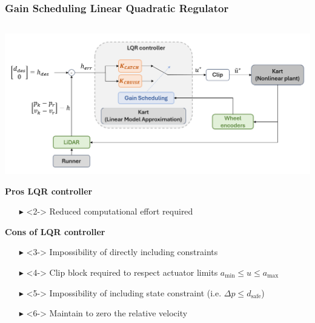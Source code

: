 \documentclass[9pt, aspectratio=169]{beamer}
\begin{document}
\begin{frame}
\frametitle{Gain Scheduling Linear Quadratic Regulator}
\begin{columns}
\begin{column}{0.40\textwidth}
	\begin{center}
  		\includegraphics[width=1.2\textwidth]{LQR_scheme} 
	\end{center}
\vspace{-0.2cm}
\begin{block}{}
\centering
\textbf{Pros LQR controller}
\begin{itemize}
\footnotesize
	\item[$\blacktriangleright$]<2-> Reduced computational effort required
\end{itemize}
\end{block}
\vspace{-0.2cm}
\begin{block}{}
\centering
\textbf{Cons of LQR controller} \\
\begin{itemize}
\footnotesize
	\item[$\blacktriangleright$]<3-> Impossibility of directly including constraints
	\item[$\blacktriangleright$]<4-> Clip block required to respect actuator limits $a_\text{min} \leq u \leq a_\text{max}$
	\item[$\blacktriangleright$]<5-> Impossibility of including state constraint (i.e. $\Delta p \leq d_\text{safe}$)
	\item[$\blacktriangleright$]<6-> Maintain to zero the relative velocity
\end{itemize}

\end{block}


\end{column}
\end{columns}
\end{frame}
\end{document}
